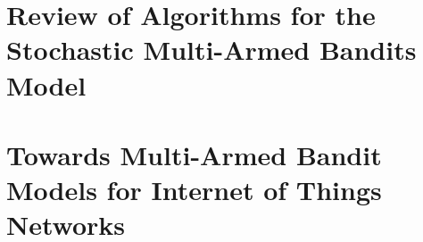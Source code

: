 \setcounter{mtc}{0}
\adjustmtc



\part{Review of Algorithms for the Stochastic Multi-Armed Bandits Model}







\part{Towards Multi-Armed Bandit Models for Internet of Things Networks}








